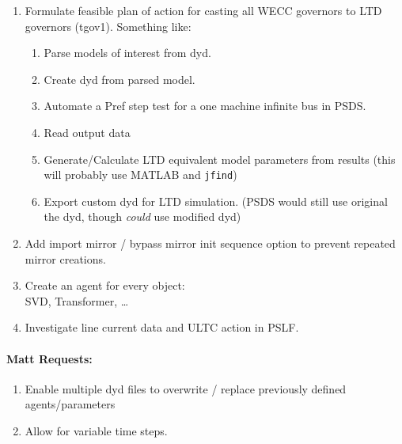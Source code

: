 \documentclass[12pt]{article}
\begin{document}
\begin{multicols}{2}
\begin{enumerate}
\begin{enumerate}
		\item Formulate feasible plan of action for casting all WECC governors to LTD governors (tgov1). Something like:
		\begin{enumerate}
		\item Parse models of interest from dyd.
		\item Create dyd from parsed model.
		\item Automate a Pref step test for a one machine infinite bus in PSDS.
		\item Read output data
		\item Generate/Calculate LTD equivalent model parameters from results (this will probably use MATLAB and \verb|jfind|)
		\item Export custom dyd for LTD simulation. (PSDS would still use original the dyd, though \emph{could} use modified dyd)
		\end{enumerate}

		\item Add import mirror / bypass mirror init sequence option to prevent repeated mirror creations.

		\item Create an agent for every object: \\ SVD, Transformer, \ldots
		
		\item Investigate line current data and ULTC action in PSLF.
	\end{enumerate}

\paragraph{Matt Requests:}
\begin{enumerate}
		\item Enable multiple dyd files to overwrite / replace previously defined agents/parameters
		\item Allow for variable time steps.
\end{enumerate}

	\end{enumerate}

		

\vfill\null

\end{multicols}
\end{document}
